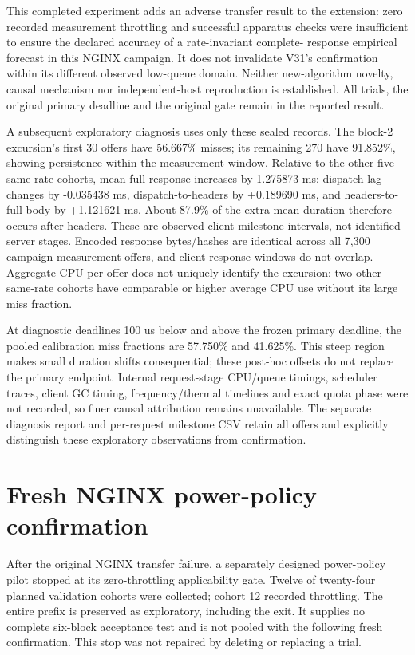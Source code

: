 \documentclass[11pt,a4paper]{article}
\begin{document}
This completed experiment adds an adverse transfer result to the extension:
zero recorded measurement throttling and successful apparatus checks were
insufficient to ensure the declared accuracy of a rate-invariant complete-
response empirical forecast in this NGINX campaign. It does not invalidate
V31's confirmation within its different observed low-queue domain. Neither
new-algorithm novelty, causal mechanism nor independent-host reproduction is
established. All trials, the original primary deadline and the original gate
remain in the reported result.

A subsequent exploratory diagnosis uses only these sealed records. The
block-2 excursion's first 30 offers have 56.667\% misses; its remaining 270
have 91.852\%, showing persistence within the measurement window. Relative
to the other five same-rate cohorts, mean full response increases by 1.275873
ms: dispatch lag changes by -0.035438 ms, dispatch-to-headers by +0.189690 ms,
and headers-to-full-body by +1.121621 ms. About 87.9\% of the extra mean duration
therefore occurs after headers. These are observed client milestone intervals,
not identified server stages. Encoded response bytes/hashes are identical
across all 7,300 campaign measurement offers, and client response windows do
not overlap. Aggregate CPU per offer does not uniquely identify the excursion:
two other same-rate cohorts have comparable or higher average CPU use without
its large miss fraction.

At diagnostic deadlines 100 us below and above the frozen primary deadline,
the pooled calibration miss fractions are 57.750\% and 41.625\%. This steep
region makes small duration shifts consequential; these post-hoc offsets do
not replace the primary endpoint. Internal request-stage CPU/queue timings,
scheduler traces, client GC timing, frequency/thermal timelines and exact
quota phase were not recorded, so finer causal attribution remains unavailable.
The separate diagnosis report and per-request milestone CSV retain all offers
and explicitly distinguish these exploratory observations from confirmation.

\section{Fresh NGINX power-policy confirmation}

After the original NGINX transfer failure, a separately designed power-policy
pilot stopped at its zero-throttling applicability gate. Twelve of twenty-four
planned validation cohorts were collected; cohort 12 recorded throttling.
The entire prefix is preserved as exploratory, including the exit. It supplies
no complete six-block acceptance test and is not pooled with the following
fresh confirmation. This stop was not repaired by deleting or replacing a trial.
\end{document}

